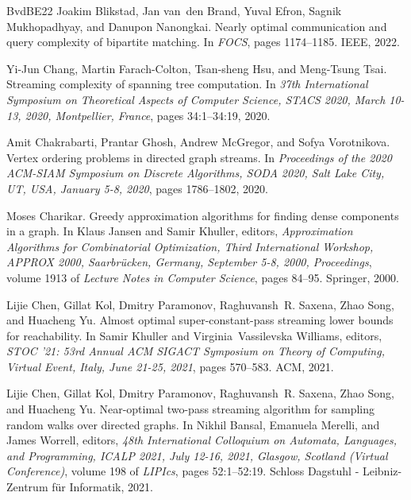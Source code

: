 \documentclass[11pt,letterpaper]{article}
\theoremstyle{definition}
\begin{document}
\begin{thebibliography}{BvdBE{\etalchar{+}}22}
Joakim Blikstad, Jan van~den Brand, Yuval Efron, Sagnik Mukhopadhyay, and Danupon Nanongkai.
\newblock Nearly optimal communication and query complexity of bipartite matching.
\newblock In {\em {FOCS}}, pages 1174--1185. {IEEE}, 2022.

Yi{-}Jun Chang, Martin Farach{-}Colton, Tsan{-}sheng Hsu, and Meng{-}Tsung Tsai.
\newblock Streaming complexity of spanning tree computation.
\newblock In {\em 37th International Symposium on Theoretical Aspects of Computer Science, {STACS} 2020, March 10-13, 2020, Montpellier, France}, pages 34:1--34:19, 2020.

Amit Chakrabarti, Prantar Ghosh, Andrew McGregor, and Sofya Vorotnikova.
\newblock Vertex ordering problems in directed graph streams.
\newblock In {\em Proceedings of the 2020 {ACM-SIAM} Symposium on Discrete Algorithms, {SODA} 2020, Salt Lake City, UT, USA, January 5-8, 2020}, pages 1786--1802, 2020.

Moses Charikar.
\newblock Greedy approximation algorithms for finding dense components in a graph.
\newblock In Klaus Jansen and Samir Khuller, editors, {\em Approximation Algorithms for Combinatorial Optimization, Third International Workshop, {APPROX} 2000, Saarbr{\"{u}}cken, Germany, September 5-8, 2000, Proceedings}, volume 1913 of {\em Lecture Notes in Computer Science}, pages 84--95. Springer, 2000.

Lijie Chen, Gillat Kol, Dmitry Paramonov, Raghuvansh~R. Saxena, Zhao Song, and Huacheng Yu.
\newblock Almost optimal super-constant-pass streaming lower bounds for reachability.
\newblock In Samir Khuller and Virginia~Vassilevska Williams, editors, {\em {STOC} '21: 53rd Annual {ACM} {SIGACT} Symposium on Theory of Computing, Virtual Event, Italy, June 21-25, 2021}, pages 570--583. {ACM}, 2021.

Lijie Chen, Gillat Kol, Dmitry Paramonov, Raghuvansh~R. Saxena, Zhao Song, and Huacheng Yu.
\newblock Near-optimal two-pass streaming algorithm for sampling random walks over directed graphs.
\newblock In Nikhil Bansal, Emanuela Merelli, and James Worrell, editors, {\em 48th International Colloquium on Automata, Languages, and Programming, {ICALP} 2021, July 12-16, 2021, Glasgow, Scotland (Virtual Conference)}, volume 198 of {\em LIPIcs}, pages 52:1--52:19. Schloss Dagstuhl - Leibniz-Zentrum f{\"{u}}r Informatik, 2021.


\end{thebibliography}
\end{document}
